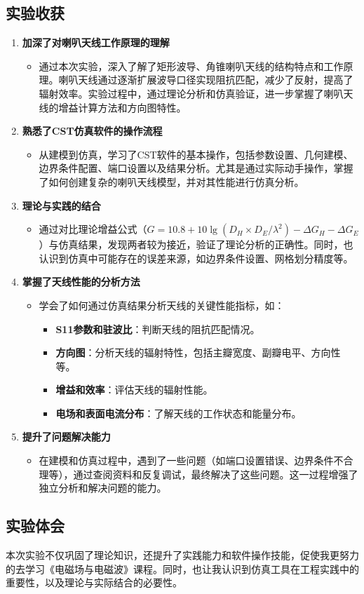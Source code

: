 \documentclass[12pt,a4paper,UTF8]{article}
\begin{document}
\subsection{实验收获}  
\begin{enumerate}
    \item \textbf{加深了对喇叭天线工作原理的理解}  
    \begin{itemize}
        \item 通过本次实验，深入了解了矩形波导、角锥喇叭天线的结构特点和工作原理。喇叭天线通过逐渐扩展波导口径实现阻抗匹配，减少了反射，提高了辐射效率。实验过程中，通过理论分析和仿真验证，进一步掌握了喇叭天线的增益计算方法和方向图特性。
    \end{itemize}

    \item \textbf{熟悉了CST仿真软件的操作流程}  
    \begin{itemize}
        \item 从建模到仿真，学习了CST软件的基本操作，包括参数设置、几何建模、边界条件配置、端口设置以及结果分析。尤其是通过实际动手操作，掌握了如何创建复杂的喇叭天线模型，并对其性能进行仿真分析。
    \end{itemize}

    \item \textbf{理论与实践的结合}  
    \begin{itemize}
        \item 通过对比理论增益公式（$G = 10.8 + 10\lg(D_H \times D_E / \lambda^2) - \Delta G_H - \Delta G_E$）与仿真结果，发现两者较为接近，验证了理论分析的正确性。同时，也认识到仿真中可能存在的误差来源，如边界条件设置、网格划分精度等。
    \end{itemize}

    \item \textbf{掌握了天线性能的分析方法}  
    \begin{itemize}
        \item 学会了如何通过仿真结果分析天线的关键性能指标，如：
        \begin{itemize}
            \item \textbf{S11参数和驻波比}：判断天线的阻抗匹配情况。
            \item \textbf{方向图}：分析天线的辐射特性，包括主瓣宽度、副瓣电平、方向性等。
            \item \textbf{增益和效率}：评估天线的辐射性能。
            \item \textbf{电场和表面电流分布}：了解天线的工作状态和能量分布。
        \end{itemize}
    \end{itemize}

    \item \textbf{提升了问题解决能力}  
    \begin{itemize}
        \item 在建模和仿真过程中，遇到了一些问题（如端口设置错误、边界条件不合理等），通过查阅资料和反复调试，最终解决了这些问题。这一过程增强了独立分析和解决问题的能力。
    \end{itemize}

\end{enumerate}

\subsection{实验体会}  
本次实验不仅巩固了理论知识，还提升了实践能力和软件操作技能，促使我更努力的去学习《电磁场与电磁波》课程。同时，也让我认识到仿真工具在工程实践中的重要性，以及理论与实际结合的必要性。
\end{document}

